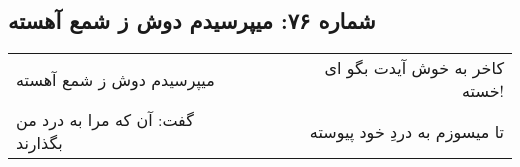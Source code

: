 \begin{center}
\section*{شماره ۷۶: میپرسیدم دوش ز شمع آهسته}
\label{sec:076}
\begin{longtable}{l p{0.5cm} r}
میپرسیدم دوش ز شمع آهسته
&&
کاخر به خوش آیدت بگو ای خسته!
\\
گفت: آن که مرا به درد من بگذارند
&&
تا میسوزم به دردِ خود پیوسته
\\
\end{longtable}
\end{center}
